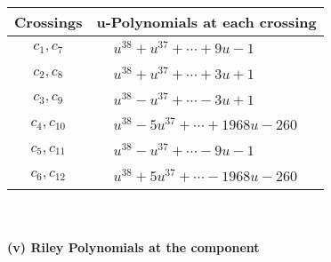 \documentclass[1p]{elsarticle_modified}
\theoremstyle{definition}
\begin{document}
\begin{tabular}{m{50pt}|m{274pt}}
Crossings & \hspace{64pt}u-Polynomials at each crossing \\
\hline $$\begin{aligned}c_{1},c_{7}\end{aligned}$$&$\begin{aligned}
&u^{38}+u^{37}+\cdots+9 u-1
\end{aligned}$\\
\hline $$\begin{aligned}c_{2},c_{8}\end{aligned}$$&$\begin{aligned}
&u^{38}+u^{37}+\cdots+3 u+1
\end{aligned}$\\
\hline $$\begin{aligned}c_{3},c_{9}\end{aligned}$$&$\begin{aligned}
&u^{38}- u^{37}+\cdots-3 u+1
\end{aligned}$\\
\hline $$\begin{aligned}c_{4},c_{10}\end{aligned}$$&$\begin{aligned}
&u^{38}-5 u^{37}+\cdots+1968 u-260
\end{aligned}$\\
\hline $$\begin{aligned}c_{5},c_{11}\end{aligned}$$&$\begin{aligned}
&u^{38}- u^{37}+\cdots-9 u-1
\end{aligned}$\\
\hline $$\begin{aligned}c_{6},c_{12}\end{aligned}$$&$\begin{aligned}
&u^{38}+5 u^{37}+\cdots-1968 u-260
\end{aligned}$\\
\hline
\end{tabular}\\~\\
\newpage\renewcommand{\arraystretch}{1}
\flushleft \textbf{(v) Riley Polynomials at the component}\newline \\
\end{document}
